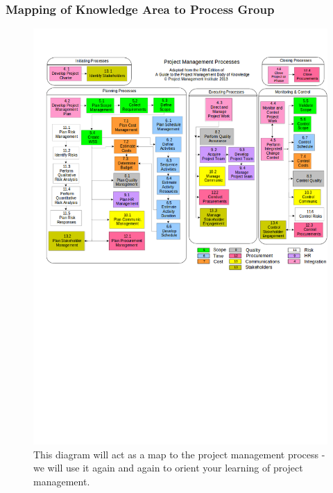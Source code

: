 \documentclass{beamer}
\begin{document}
\begin{frame}
\frametitle{Mapping of Knowledge Area to Process Group}
\begin{figure}
\caption{This diagram will act as a map to the project management process - we will use it again and again to orient your learning of project management.}
\vspace{-0.8cm}
\includegraphics[scale=0.3]{mapping}
\end{figure}
\end{frame}
\end{document}
